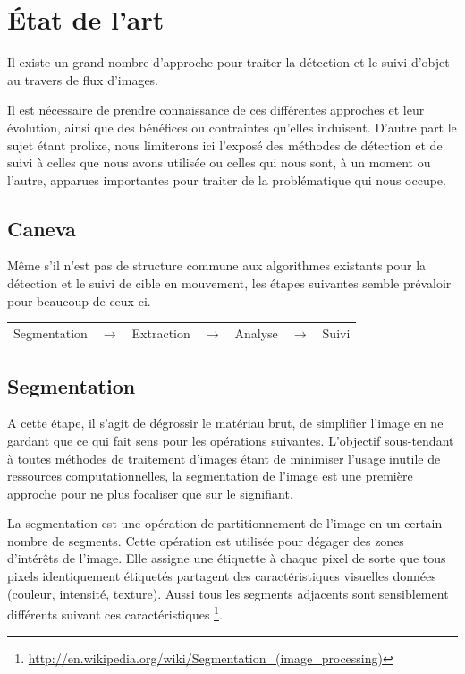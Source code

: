 \documentclass[a4paper,12pt]{report}
\begin{document}

\chapter{\'{E}tat de l'art}

Il existe un grand nombre d'approche pour traiter la détection et le suivi d'objet au travers de flux d'images. 

Il est nécessaire de prendre connaissance de ces différentes approches et leur évolution, ainsi que des bénéfices ou contraintes qu'elles induisent. D'autre part le sujet étant prolixe, nous limiterons ici l'exposé des méthodes de détection et de suivi à celles que nous avons utilisée ou celles qui nous sont, à un moment ou l'autre, apparues importantes pour traiter de la problématique qui nous occupe.

\section{Caneva}
Même s'il n'est pas de structure commune aux algorithmes existants pour la détection et le suivi de cible en mouvement, les étapes suivantes semble prévaloir pour beaucoup de ceux-ci.\\
\begin{center}
\begin{tabular}{ c c c c c c c } 
\cellcolor[gray]{0.9} Segmentation & $\rightarrow$ & \cellcolor[gray]{0.9} Extraction & $\rightarrow$ & \cellcolor[gray]{0.9} Analyse & $\rightarrow$ & \cellcolor[gray]{0.9} Suivi\\  
\end{tabular} 
\end{center}

\section{Segmentation}
A cette étape, il s'agit de dégrossir le matériau brut, de simplifier l'image en ne gardant que ce qui fait sens pour les opérations suivantes. L'objectif sous-tendant à toutes méthodes de traitement d'images étant de minimiser l'usage inutile de ressources computationnelles, la segmentation de l'image est une première approche pour ne plus focaliser que sur le signifiant. 

La segmentation est une opération de partitionnement de l'image en un certain nombre de segments. Cette opération est utilisée pour dégager des zones d'intérêts de l'image. Elle assigne une étiquette à chaque pixel de sorte que tous pixels identiquement étiquetés partagent des caractéristiques visuelles données (couleur, intensité, texture). Aussi tous les segments adjacents sont sensiblement différents suivant ces caractéristiques \footnote{\url{http://en.wikipedia.org/wiki/Segmentation_(image_processing)}}.\\
\end{document}
